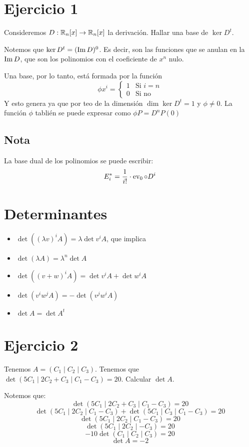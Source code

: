 \documentclass{article}
\begin{document}
\section*{Ejercicio 1}
Consideremos $D : \mathbb{R}_n[x] \to \mathbb{R}_n[x]$ la derivación. Hallar una base de $\ker D^t$.

Notemos que $\ker D^t = (\operatorname{Im} D)^0$. Es decir, son las funciones que se anulan en la $\operatorname{Im} D$, que son los polinomios con el coeficiente de $x^n$ nulo.

Una base, por lo tanto, está formada por la función
\[
	\phi x^i = 
	\begin{cases}
		1 & \text{Si $i = n$} \\
	0 & \text{Si no}
	\end{cases}
\]
Y esto genera ya que por teo de la dimensión $\dim \ker D^t = 1$ y $\phi \neq 0$. La función $\phi$ tablién se puede expresar como $\phi P = D^nP (0)$

\subsection*{Nota}
La base dual de los polinomios se puede escribir:
\[
	E^*_i = \frac{1}{i!} \cdot \operatorname{ev}_0 \circ D^i
\]

\section*{Determinantes}
\begin{itemize}
	\item $\det ((\lambda v)^iA) = \lambda \det v^iA$, que implica
	\item $\det (\lambda A) = \lambda^n \det A$
	\item $\det ((v+w)^iA) = \det v^iA + \det w^iA$
	\item $\det (v^iw^jA) = - \det (v^jw^iA)$
	\item $\det A = \det A^t$
\end{itemize}

\section*{Ejercicio 2}
Tenemos $A = (C_1 \mid C_2 \mid C_3)$. Tenemos que $\det (5C_1 \mid 2C_2+C_3 \mid C_1 - C_3) = 20$. Calcular $\det A$.

Notemos que:
\[\det (5C_1 \mid 2C_2+C_3 \mid C_1 - C_3) = 20\]
\[\det (5C_1 \mid 2C_2 \mid C_1 - C_3) +\det (5C_1 \mid C_3 \mid C_1 - C_3) = 20\]
\[\det (5C_1 \mid 2C_2 \mid C_1 - C_3) = 20\]
\[\det (5C_1 \mid 2C_2 \mid - C_3) = 20\]
\[-10\det (C_1 \mid C_2 \mid C_3) = 20\]
\[\det A = -2\]
\end{document}
